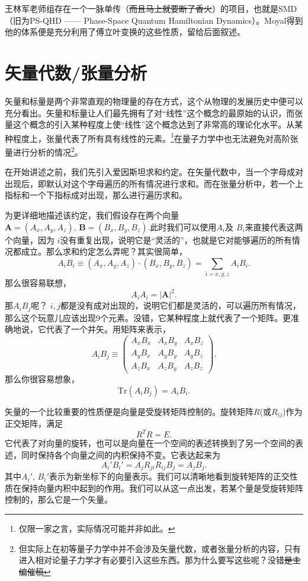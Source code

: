 \documentclass[12pt,a4paper,openany,twoside]{book}
\numberwithin{equation}{section}
\begin{document}
王林军老师组存在一个一脉单传（\sout{而且马上就要断了香火}）的项目，也就是SMD（旧为PS-QHD —— Phase-Space Quantum Hamiltonian Dynamics）。Moyal得到他的体系便是充分利用了傅立叶变换的这些性质，留给后面叙述。

\section{矢量代数/张量分析}
矢量和标量是两个非常直观的物理量的存在方式，这个从物理的发展历史中便可以充分看出。矢量和标量让人们最先拥有了对``线性''这个概念的最原始的认识，而张量这个概念的引入某种程度上使``线性''这个概念达到了非常高的理论化水平。从某种程度上，张量代表了所有具有线性的元素。\footnote{仅限一家之言，实际情况可能并非如此。}在量子力学中也无法避免对高阶张量进行分析的情况\footnote{但实际上在初等量子力学中并不会涉及矢量代数，或者张量分析的内容，只有进入相对论量子力学才有必要引入这些东西。那为什么要写这些呢？没错\sout{是主编催稿}}。

在开始讲述之前，我们先引入爱因斯坦求和约定。在矢量代数中，当一个字母成对出现后，即默认对这个字母遍历的所有情况进行求和。而在张量分析中，若一个上指标和一个下指标成对出现，那么进行遍历求和。

为更详细地描述该约定，我们假设存在两个向量$\mathbf{A} = (A_x, A_y, A_z), \, \mathbf{B} = (B_x,B_y,B_z)$.此时我们可以使用$A_i$及 $B_i$来直接代表这两个向量，因为 $i$没有重复出现，说明它是``灵活的''，也就是它对能够遍历的所有情况都成立。那么求和约定怎么弄呢？其实很简单，
 \[
	 A_i B_i \equiv (A_x, A_y, A_z) \cdot (B_x,B_y,B_z)  = \sum_{i=x,y,z} A_iB_i
.\] 
那么很容易联想，
\[
	A_i A_i = |\mathbf{A}|^2
.\] 
那$A_i B_j$呢？ $i,j$都是没有成对出现的，说明它们都是灵活的，可以遍历所有情况，那么这个玩意儿应该出现9个元素。没错，它某种程度上就代表了一个矩阵。更准确地说，它代表了一个并矢。用矩阵来表示，
\[
A_i B_j \equiv 
\begin{pmatrix}
	A_x B_x & A_x B_y & A_x B_z \\
	A_y B_x & A_y B_y & A_y B_z \\
	A_z B_x & A_z B_y & A_z B_z 
\end{pmatrix}
.\] 
那么你很容易想象，
\begin{equation}
	\mathrm{Tr}(A_i B_j) = A_iB_i.
\end{equation}

矢量的一个比较重要的性质便是向量是受旋转矩阵控制的。旋转矩阵$R$(或$R_{ij}$)作为正交矩阵，满足
\[
R^T R = E
.\]
它代表了对向量的旋转，也可以是向量在一个空间的表述转换到了另一个空间的表述，同时保持各个向量之间的内积保持不变。它表达起来为
\[
	A_i' B_i' = A_j R_{ji} R_{ij} B_j = A_j B_j
.\] 
其中$A_i',\,B_i'$表示为新坐标下的向量表示。我们可以清晰地看到旋转矩阵的正交性质在保持向量内积中起到的作用。我们可以从这一点出发，若某个量是受旋转矩阵控制的，那么它是一个矢量。
\end{document}
